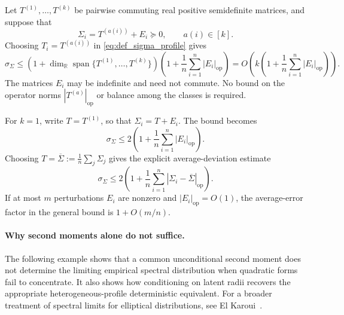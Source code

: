 \documentclass[EJP, preprint, NODS, nobera, nofontexpansion]{ejpecp}
\DeclareMathOperator{\op}{op}
\begin{document}
\begin{example}
\label{exa:profile_commuting_matrix_perturbations}
Let $T^{(1)},\ldots,T^{(k)}$ be pairwise commuting real positive
semidefinite matrices, and suppose that
\[
    \Sigma_i=T^{(a(i))}+E_i\succeq0,
    \qquad a(i)\in[k].
\]
Choosing $T_i=T^{(a(i))}$ in \eqref{eq:def_sigma_profile} gives
\[
    \sigma_\Sigma
    \leq
    \left(
        1+\dim_{\mathbb R}
        \operatorname{span}\{T^{(1)},\ldots,T^{(k)}\}
    \right)
    \left(1+\frac1n\sum_{i=1}^n|E_i|_{\op}\right)
    =O\left(k\left(1+\frac1n\sum_{i=1}^n|E_i|_{\op}\right)\right).
\]
The matrices $E_i$ may be indefinite and need not commute. No bound on
the operator norms $|T^{(a)}|_{\op}$ or balance among the classes is
required.

For $k=1$, write $T=T^{(1)}$, so that $\Sigma_i=T+E_i$. The bound becomes
\[
    \sigma_\Sigma
    \leq2\left(1+\frac1n\sum_{i=1}^n|E_i|_{\op}\right).
\]
Choosing $T=\overline\Sigma:=\frac1n\sum_j\Sigma_j$ gives the explicit
average-deviation estimate
\[
    \sigma_\Sigma
    \leq2\left(1+\frac1n\sum_{i=1}^n
        |\Sigma_i-\overline\Sigma|_{\op}\right).
\]
If at most $m$ perturbations $E_i$ are nonzero and $|E_i|_{\op}=O(1)$, the
average-error factor in the general bound is $1+O(m/n)$.
\end{example}

\paragraph{Why second moments alone do not suffice.}
The following example shows that a common unconditional second moment does
not determine the limiting empirical spectral distribution when quadratic
forms fail to concentrate.  It also shows how conditioning on latent radii
recovers the appropriate heterogeneous-profile deterministic equivalent.
For a broader treatment of spectral limits for elliptical distributions,
see El Karoui~\cite{ELK09}.
\end{document}
